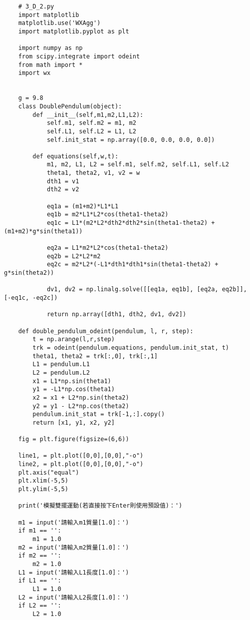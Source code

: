 \documentclass[UTF8,a4paper,12pt]{article}
\begin{document}
\begin{lstlisting}
    # 3_D_2.py
    import matplotlib
    matplotlib.use('WXAgg')
    import matplotlib.pyplot as plt
    
    import numpy as np
    from scipy.integrate import odeint
    from math import *
    import wx
    
    
    g = 9.8
    class DoublePendulum(object):
        def __init__(self,m1,m2,L1,L2):
            self.m1, self.m2 = m1, m2
            self.L1, self.L2 = L1, L2
            self.init_stat = np.array([0.0, 0.0, 0.0, 0.0])
    
        def equations(self,w,t):
            m1, m2, L1, L2 = self.m1, self.m2, self.L1, self.L2
            theta1, theta2, v1, v2 = w
            dth1 = v1
            dth2 = v2
    
            eq1a = (m1+m2)*L1*L1
            eq1b = m2*L1*L2*cos(theta1-theta2)
            eq1c = L1*(m2*L2*dth2*dth2*sin(theta1-theta2) + (m1+m2)*g*sin(theta1))
    
            eq2a = L1*m2*L2*cos(theta1-theta2)
            eq2b = L2*L2*m2
            eq2c = m2*L2*(-L1*dth1*dth1*sin(theta1-theta2) + g*sin(theta2))
    
            dv1, dv2 = np.linalg.solve([[eq1a, eq1b], [eq2a, eq2b]], [-eq1c, -eq2c])
    
            return np.array([dth1, dth2, dv1, dv2])
    
    def double_pendulum_odeint(pendulum, l, r, step):
        t = np.arange(l,r,step)
        trk = odeint(pendulum.equations, pendulum.init_stat, t)
        theta1, theta2 = trk[:,0], trk[:,1]
        L1 = pendulum.L1
        L2 = pendulum.L2
        x1 = L1*np.sin(theta1)
        y1 = -L1*np.cos(theta1)
        x2 = x1 + L2*np.sin(theta2)
        y2 = y1 - L2*np.cos(theta2)
        pendulum.init_stat = trk[-1,:].copy()
        return [x1, y1, x2, y2]
    
    fig = plt.figure(figsize=(6,6))
    
    line1, = plt.plot([0,0],[0,0],"-o")
    line2, = plt.plot([0,0],[0,0],"-o")
    plt.axis("equal")
    plt.xlim(-5,5)
    plt.ylim(-5,5)
    
    print('模擬雙擺運動(若直接按下Enter則使用預設值)：')
    
    m1 = input('請輸入m1質量[1.0]：')
    if m1 == '':
        m1 = 1.0
    m2 = input('請輸入m2質量[1.0]：')
    if m2 == '':
        m2 = 1.0
    L1 = input('請輸入L1長度[1.0]：')
    if L1 == '':
        L1 = 1.0
    L2 = input('請輸入L2長度[1.0]：')
    if L2 == '':
        L2 = 1.0
    

\end{lstlisting}
\end{document}
